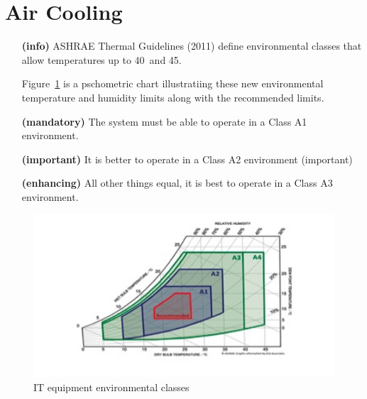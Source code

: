 \section{Air Cooling}
\begin{itemize}
\item[\textbf{(info)}]
ASHRAE Thermal Guidelines (2011) define environmental classes that allow temperatures 
up to 40\celsius~and 45\celsius.  

Figure~\ref{fig:ITenviron} is a pschometric chart illustratiing these new environmental 
temperature and humidity limits along with the recommended limits.

\item[\textbf{(mandatory)}]
The system must be able to operate in a Class A1 environment.  

\item[\textbf{(important)}]
It is better to operate in a Class A2 environment (important) 

\item[\textbf{(enhancing)}]
All other things equal, it is best to operate in a Class A3 environment.
\end{itemize}

\begin{figure}[htbp]
\centering
\includegraphics[width=5in]{fig2}
\caption{IT equipment environmental classes}
\label{fig:ITenviron}
\end{figure}

